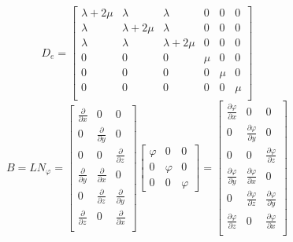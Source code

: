 \documentclass[12pt]{article}
\begin{document}
%
\begin{equation}	\label{eq45}
D_e = 
\left[
\begin{array}{cccccc}
\lambda+2\mu & \lambda & \lambda & 0 & 0 & 0 			\\
\lambda & \lambda+2\mu & \lambda & 0 & 0 & 0 			\\
\lambda & \lambda & \lambda+2\mu & 0 & 0 & 0 			\\
0 & 0 & 0 & \mu & 0 & 0 			\\
0 & 0 & 0 & 0 &  \mu & 0 			\\
0 & 0 & 0 & 0 & 0 &  \mu 			\\
\end{array}
\right]
\end{equation}
\newline
\newline
%
\newline
\begin{equation}		\label{eq46}
B=LN_{\varphi}=\left[
\begin{array}{ccc}
\frac{\partial}{\partial x} & 0 & 0  			\\
0 &\frac{\partial}{\partial y} & 0  				\\
0 & 0 &\frac{\partial}{\partial z} 				\\
\frac{\partial}{\partial y} & \frac{\partial}{\partial x} & 0  			\\
0 & \frac{\partial}{\partial z} & \frac{\partial}{\partial y}  			\\
\frac{\partial}{\partial z} & 0 & \frac{\partial}{\partial x}  			\\
\end{array}
\right]
%
\left[
\begin{array}{ccc}
\varphi & 0 & 0  			\\
0 &\varphi & 0  				\\
0 & 0 &\varphi				
\end{array}
\right]
=
\left[
\begin{array}{ccc}
\frac{\partial \varphi}{\partial x} & 0 & 0  			\\
0 &\frac{\partial \varphi}{\partial y} & 0  				\\
0 & 0 &\frac{\partial \varphi}{\partial z} 				\\
\frac{\partial \varphi}{\partial y} & \frac{\partial \varphi}{\partial x} & 0  			\\
0 & \frac{\partial \varphi}{\partial z} & \frac{\partial \varphi}{\partial y}  			\\
\frac{\partial \varphi}{\partial z} & 0 & \frac{\partial \varphi}{\partial x}  			\\
\end{array}
\right]
\end{equation}
\end{document}
